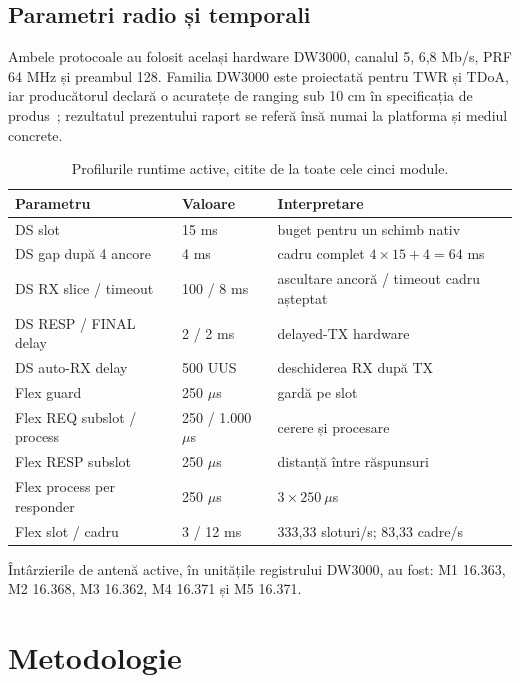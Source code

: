 \documentclass[11pt,a4paper]{article}
\begin{document}
\subsection{Parametri radio și temporali}

Ambele protocoale au folosit același hardware DW3000, canalul 5, 6,8 Mb/s,
PRF 64 MHz și preambul 128. Familia DW3000 este proiectată pentru TWR și TDoA,
iar producătorul declară o acuratețe de ranging sub 10 cm în specificația de
produs~\cite{qorvo-product,dwm3000-datasheet}; rezultatul prezentului raport se
referă însă numai la platforma și mediul concrete.

\begin{table}[H]
  \centering
  \caption{Profilurile runtime active, citite de la toate cele cinci module.}
  \small
  \begin{tabularx}{\textwidth}{lR{25mm}Y}
    \toprule
    Parametru & Valoare & Interpretare\\
    \midrule
    DS slot & 15 ms & buget pentru un schimb nativ\\
    DS gap după 4 ancore & 4 ms & cadru complet $4\times15+4=64$ ms\\
    DS RX slice / timeout & 100 / 8 ms & ascultare ancoră / timeout cadru așteptat\\
    DS RESP / FINAL delay & 2 / 2 ms & delayed-TX hardware\\
    DS auto-RX delay & 500 UUS & deschiderea RX după TX\\
    \midrule
    Flex guard & 250 $\mu$s & gardă pe slot\\
    Flex REQ subslot / process & 250 / 1.000 $\mu$s & cerere și procesare\\
    Flex RESP subslot & 250 $\mu$s & distanță între răspunsuri\\
    Flex process per responder & 250 $\mu$s & $3\times250\ \mu$s\\
    Flex slot / cadru & 3 / 12 ms & 333,33 sloturi/s; 83,33 cadre/s\\
    \bottomrule
  \end{tabularx}
\end{table}

Întârzierile de antenă active, în unitățile registrului DW3000, au fost:
M1 16.363, M2 16.368, M3 16.362, M4 16.371 și M5 16.371.

\section{Metodologie}
\end{document}
